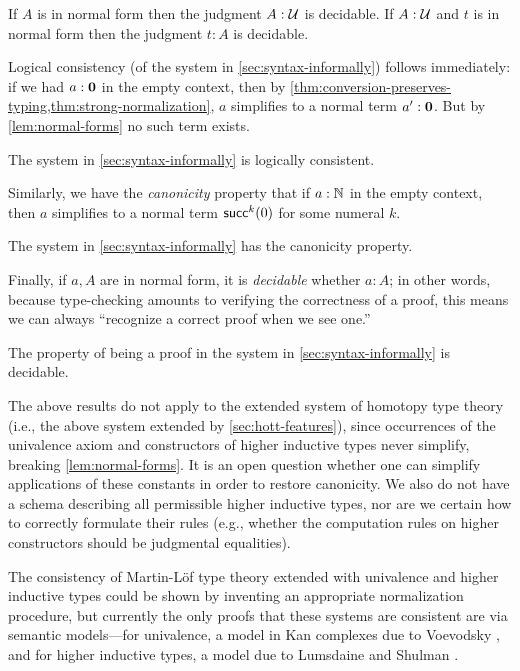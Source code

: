 \begin{thm}
  If $A$ is in normal form then the 
  judgment $A : \mathcal{U}$ is decidable. If $A : \mathcal{U}$ and $t$ is in normal form then the judgment
  $t:A$ is decidable.
\end{thm}

Logical consistency (of the system in \autoref{sec:syntax-informally}) follows
immediately: if we had $a:\mathbf{0}$ in the empty context, then by
\autoref{thm:conversion-preserves-typing,thm:strong-normalization}, $a$
simplifies to a normal term $a':\mathbf{0}$. But by
\autoref{lem:normal-forms} no such term exists.

\begin{cor}
 The system in \autoref{sec:syntax-informally} is logically consistent.
\end{cor}

Similarly, we have the \emph{canonicity} property that if $a:\mathbb{N}$ in the empty
context, then $a$ simplifies to a normal term $\mathsf{succ}^k(0)$ for some numeral $k$.

\begin{cor}
 The system in \autoref{sec:syntax-informally} has the canonicity property.
\end{cor}

Finally, if $a,A$ are in normal form, it is \emph{decidable} whether $a:A$; in
other words, because type-checking amounts to verifying the correctness of a
proof, this means we can always ``recognize a correct proof when we see one.''

\begin{cor}
The property of being a proof in the system in \autoref{sec:syntax-informally} is decidable.
\end{cor}

\mentalpause

The above results do not apply to the extended system of homotopy type
theory (i.e., the above system extended by \autoref{sec:hott-features}), since
occurrences of the univalence axiom and constructors of higher inductive types
never simplify, breaking \autoref{lem:normal-forms}. It is an open question
whether one can simplify applications of these constants in order to restore
canonicity. We also do not have a schema describing all permissible higher
inductive types, nor are we certain how to correctly formulate their rules
(e.g., whether the computation rules on higher constructors should be judgmental
equalities).

The consistency of Martin-L\"{o}f type theory extended with univalence and higher
inductive types could be shown by inventing an appropriate normalization procedure, but currently
the only proofs that these systems are consistent are via semantic models---for
univalence, a model in Kan complexes due to Voevodsky \cite{klv:ssetmodel}, and
for higher inductive types, a model due to Lumsdaine and Shulman \cite{ls:hits}.

